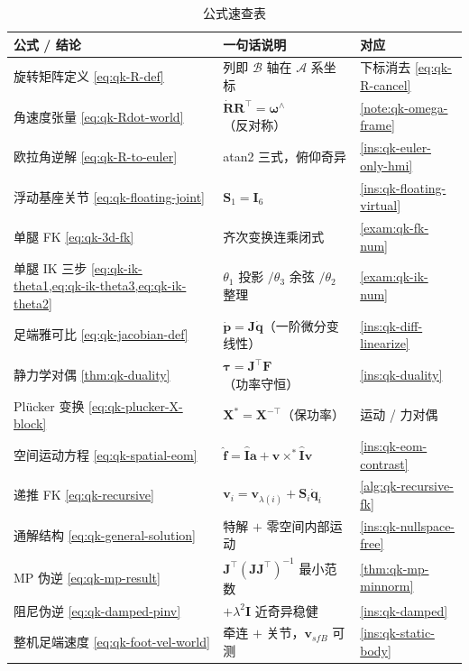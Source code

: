 \begin{table}[H]\centering\small
\caption{公式速查表}
\begin{tabular}{lll}
\toprule
公式 / 结论 & 一句话说明 & 对应 \\
\midrule
旋转矩阵定义 \cref{eq:qk-R-def} & 列即 $\mathcal{B}$ 轴在 $\mathcal{A}$ 系坐标 & 下标消去 \cref{eq:qk-R-cancel} \\
角速度张量 \cref{eq:qk-Rdot-world} & $\dot{\mathbf{R}}\mathbf{R}^\top=\boldsymbol{\omega}^\wedge$（反对称） & \cref{note:qk-omega-frame} \\
欧拉角逆解 \cref{eq:qk-R-to-euler} & atan2 三式，俯仰奇异 & \cref{ins:qk-euler-only-hmi} \\
浮动基座关节 \cref{eq:qk-floating-joint} & $\mathbf{S}_1=\mathbf{I}_6$ & \cref{ins:qk-floating-virtual} \\
单腿 FK \cref{eq:qk-3d-fk} & 齐次变换连乘闭式 & \cref{exam:qk-fk-num} \\
单腿 IK 三步 \cref{eq:qk-ik-theta1,eq:qk-ik-theta3,eq:qk-ik-theta2} & $\theta_1$ 投影 $/\theta_3$ 余弦 $/\theta_2$ 整理 & \cref{exam:qk-ik-num} \\
足端雅可比 \cref{eq:qk-jacobian-def} & $\dot{\boldsymbol{p}}=\mathbf{J}\dot{\boldsymbol{q}}$（一阶微分变线性） & \cref{ins:qk-diff-linearize} \\
静力学对偶 \cref{thm:qk-duality} & $\boldsymbol{\tau}=\mathbf{J}^\top\mathbf{F}$（功率守恒） & \cref{ins:qk-duality} \\
Plücker 变换 \cref{eq:qk-plucker-X-block} & $\mathbf{X}^{*}=\mathbf{X}^{-\top}$（保功率） & 运动 / 力对偶 \\
空间运动方程 \cref{eq:qk-spatial-eom} & $\hat{\mathbf{f}}=\hat{\mathbf{I}}\boldsymbol{a}+\boldsymbol{v}\times^{*}\hat{\mathbf{I}}\boldsymbol{v}$ & \cref{ins:qk-eom-contrast} \\
递推 FK \cref{eq:qk-recursive} & $\boldsymbol{v}_i=\boldsymbol{v}_{\lambda(i)}+\mathbf{S}_i\dot{\boldsymbol{q}}_i$ & \cref{alg:qk-recursive-fk} \\
通解结构 \cref{eq:qk-general-solution} & 特解 $+$ 零空间内部运动 & \cref{ins:qk-nullspace-free} \\
MP 伪逆 \cref{eq:qk-mp-result} & $\mathbf{J}^\top(\mathbf{J}\mathbf{J}^\top)^{-1}$ 最小范数 & \cref{thm:qk-mp-minnorm} \\
阻尼伪逆 \cref{eq:qk-damped-pinv} & $+\lambda^2\mathbf{I}$ 近奇异稳健 & \cref{ins:qk-damped} \\
整机足端速度 \cref{eq:qk-foot-vel-world} & 牵连 $+$ 关节，$\boldsymbol{v}_{sfB}$ 可测 & \cref{ins:qk-static-body} \\
\bottomrule
\end{tabular}
\end{table}


